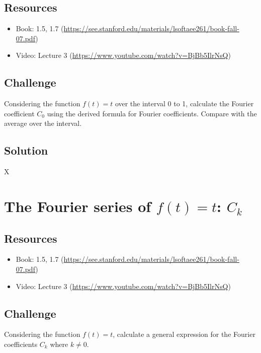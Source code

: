 \subsection*{Resources}
\begin{itemize}
    \item Book: 1.5, 1.7 (\url{https://see.stanford.edu/materials/lsoftaee261/book-fall-07.pdf})
    \item Video: Lecture 3 (\url{https://www.youtube.com/watch?v=BjBb5IlrNsQ})
\end{itemize}

\subsection*{Challenge}
Considering the function $f(t)=t$ over the interval 0 to 1, calculate the Fourier coefficient $C_0$ using the derived formula for Fourier coefficients. Compare with the average over the interval.

\subsection*{Solution}
X





\newpage

\section{The Fourier series of $f(t)=t$: $C_k$}

\subsection*{Resources}
\begin{itemize}
    \item Book: 1.5, 1.7 (\url{https://see.stanford.edu/materials/lsoftaee261/book-fall-07.pdf})
    \item Video: Lecture 3 (\url{https://www.youtube.com/watch?v=BjBb5IlrNsQ})
\end{itemize}

\subsection*{Challenge}
Considering the function $f(t)=t$, calculate a general expression for the Fourier coefficients $C_k$ where $k \ne 0$.

